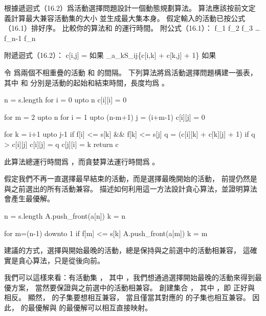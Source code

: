 \startsection[
  title={An activity-selection problem},
]

\startEXERCISE
根據遞迴式（16.2）爲活動選擇問題設計一個動態規劃算法。
算法應該按前文定義計算最大兼容活動集的大小  並生成最大集本身。
假定輸入的活動已按公式（16.1）排好序。
比較你的算法和  的運行時間。
附公式（16.1）：
\startformula
f_1 \le f_2 \le f_3 \le \ldots \le f_{n-1} \le f_n
\stopformula

附遞迴式（16.2）：
\startformula
c[i,j] = \startcases
{} \NC 如果  \NR
\NC \max_{a_k\in S_{ij}}\{c[i,k] + c[k,j] + 1\} \NC 如果  \NR
\stopcases\stopformula
\stopEXERCISE

\startANSWER
令  爲兩個不相重疊的活動  和  的間隔。
下列算法將爲活動選擇問題構建一張表，
其中  和  分別是活動的起始和結束時間，長度均爲 。

\startCLRS
n = s.length
for i = 0 upto n
	c[i][i] = 0

for m = 2 upto n
	for i = 1 upto (n-m+1)
		j = (i+m-1)
		c[i][j] = 0

		for k = i+1 upto j-1
			if f[i] <= s[k] && f[k] <= s[j]
				q = (c[i][k] + c[k][j] + 1)
				if q > c[i][j]
					c[i][j] = q
					c[j][i] = k
return c
\stopCLRS

此算法總運行時間爲 ，而貪婪算法運行時間爲 。
\stopANSWER

\startEXERCISE
假定我們不再一直選擇最早結束的活動，而是選擇最晚開始的活動，
前提仍然是與之前選出的所有活動兼容。
描述如何利用這一方法設計貪心算法，並證明算法會產生最優解。
\stopEXERCISE

\startANSWER
{}
\startCLRS
n = s.length
A.push_front(a[n])
k = n

for m=(n-1) downto 1
	if f[m] <= s[k]
		A.push_front(a[m])
		k = m
\stopCLRS

建議的方式，選擇與開始最晚的活動，總是保持與之前選中的活動相兼容，
這確實是貪心算法，只是從後向前。

我們可以這樣來看：有活動集 ，
其中 \m{a_i=[s_i,f_i)}，我們想通過選擇開始最晚的活動來得到最優方案，
當然要保證與之前選中的活動相兼容。
創建集合 ，
其中 \m{a'_i=[f_i,s_i)}，即  正好與  相反。
顯然， 的子集要想相互兼容，
當且僅當其對應的  的子集也相互兼容。
因此，  的最優解與  的最優解可以相互直接映射。
\stopANSWER

